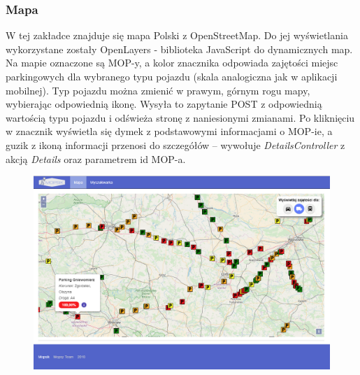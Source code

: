 \subsubsection{Mapa}
W tej zakładce znajduje się mapa Polski z OpenStreetMap. Do jej wyświetlania wykorzystane zostały OpenLayers - biblioteka JavaScript do dynamicznych map. Na mapie oznaczone są MOP-y, a kolor znacznika odpowiada zajętości miejsc parkingowych dla wybranego typu pojazdu (skala analogiczna jak w aplikacji mobilnej). Typ pojazdu można zmienić w prawym, górnym rogu mapy, wybierając odpowiednią ikonę. Wysyła to zapytanie POST z odpowiednią wartością typu pojazdu i odświeża stronę z naniesionymi zmianami. 
Po kliknięciu w znacznik wyświetla się dymek z podstawowymi informacjami o MOP-ie, a guzik z ikoną informacji przenosi do szczegółów -- wywołuje \textit{DetailsController} z akcją \textit{Details} oraz parametrem id MOP-a.

\begin{figure}[!htb]
\centering
\includegraphics[width=\textwidth]{images/mopsik_www/map.png}
\label{mopsik_www_map}
\end{figure}

